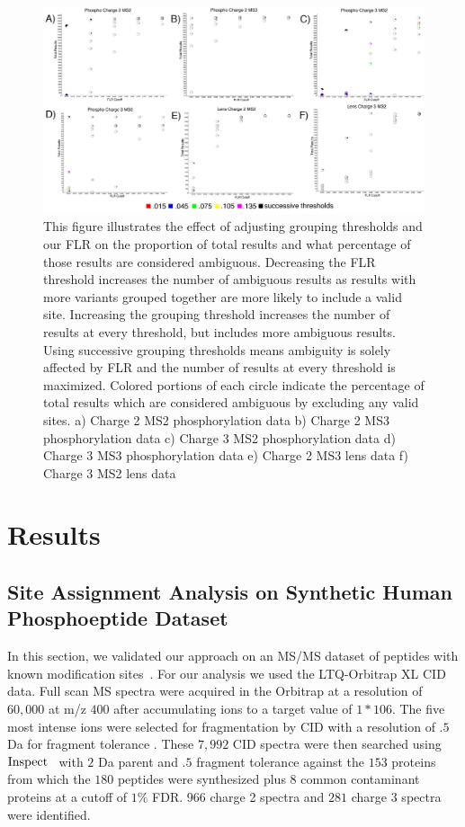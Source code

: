\documentclass[11pt]{article}
\newcommand{\inspect}{${\rm Inspect}$}
\begin{document}
{\begin{figure}[h]
\centering
\includegraphics[scale=.9]{fig/ambiguity_vs_grouping.png}
\caption[Hierarchical grouping thresholds vs ambiguity]{This figure illustrates the effect of adjusting grouping thresholds and our FLR on the proportion of total results and what percentage of those results are considered ambiguous. Decreasing the FLR threshold increases the number of ambiguous results as results with more variants grouped together are more likely to include a valid site. Increasing the grouping threshold increases the number of results at every threshold, but includes more ambiguous results. Using successive grouping thresholds means ambiguity is solely affected by FLR and the number of results at every threshold is maximized. Colored portions of each circle indicate the percentage of total results which are considered ambiguous by excluding any valid sites. a) Charge 2 MS2 phosphorylation data b) Charge 2 MS3 phosphorylation data c) Charge 3 MS2 phosphorylation data d) Charge 3 MS3 phosphorylation data e) Charge 2 MS3 lens data f) Charge 3 MS2 lens data}
\label{fig:ambiguityVsGrouping}
\end{figure}

\section{Results}\label{sec:results}
\subsection{Site Assignment Analysis on Synthetic Human Phosphoeptide Dataset}\label{sec:mascotsynthetic}

In this section, we validated our approach on an MS/MS dataset of peptides with known modification sites~\cite{savitski11}. For our analysis we used the LTQ-Orbitrap XL CID data. Full scan MS spectra were acquired in the Orbitrap at a resolution of $60,000$ at m/z $400$ after accumulating ions to a target value of $1*106$. The five most intense ions were selected for fragmentation by CID with a resolution of $.5$ Da for fragment tolerance . These $7,992$ CID spectra were then searched using \inspect ~\cite{tanner05} with $2$ Da parent and $.5$ fragment tolerance against the $153$ proteins from which the $180$ peptides were synthesized plus $8$ common contaminant proteins at a cutoff of $1\%$ FDR. $966$ charge 2 spectra and $281$ charge 3 spectra were identified.

}
\end{document}
